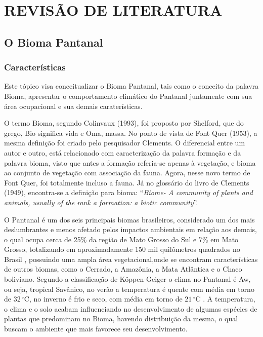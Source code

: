 
\chapter{REVISÃO DE LITERATURA}
\label{chap:fundamentacaoTeorica}

\section{O Bioma Pantanal}

\subsection{Características}

Este tópico visa conceitualizar o Bioma Pantanal, tais como o conceito da palavra Bioma, apresentar o comportamento climático do Pantanal juntamente com sua área ocupacional e sua demais caraterísticas.

O termo Bioma, segundo Colinvaux (1993), foi proposto por Shelford, que do grego, Bio significa vida e  Oma, massa. No ponto de vista de Font Quer (1953), a mesma definição foi criado pelo pesquisador Clements. O diferencial entre um autor e outro, está relacionado com caracterização da palavra formação e da palavra bioma, visto que antes a formação referia-se apenas à vegetação, e bioma ao conjunto de vegetação com associação da fauna. Agora, nesse novo termo de Font Quer, foi totalmente incluso a fauna. Já no glossário do livro de Clements (1949), encontra-se a definição para bioma: “\textit{Biome- A community of plants and animals, usually of the rank a formation: a biotic community}”. 

O Pantanal é um dos seis principais biomas brasileiros, considerado um dos mais deslumbrantes e menos afetado pelos impactos ambientais em relação aos demais, o qual ocupa cerca de 25\% da região de Mato Grosso do Sul e 7\% em Mato Grosso, totalizando em aproximadamente 150 mil quilômetros quadrados no Brasil , possuindo uma ampla área vegetacional,onde se encontram características de outros biomas, como o Cerrado, a Amazônia, a Mata Atlântica e o Chaco boliviano. Segundo a classificação de Köppen-Geiger o clima no Pantanal é Aw, ou seja, tropical Savânico, no verão a temperatura é quente com média em torno de $32\,^{\circ}\mathrm{C}$, no inverno é frio e seco, com média em torno de $21\,^{\circ}\mathrm{C}$ \cite{portal}. A temperatura, o clima e o solo  acabam influenciando no desenvolvimento de algumas espécies de plantas que predominam no Bioma, havendo distribuição da mesma, o qual buscam o ambiente que mais favorece seu desenvolvimento.

